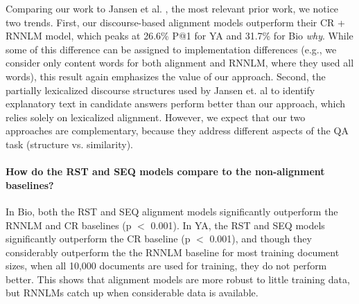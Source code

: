 Comparing our work to Jansen et al. \citeyear{jansen14}, the most relevant prior work, we notice two trends.
First, our discourse-based alignment models outperform their CR + RNNLM model, which peaks at 26.6\% P@1 for YA and 31.7\% for Bio \emph{why}. While some of this difference can be assigned to implementation differences (e.g., we consider only content words for both alignment and RNNLM, where they used all words), this result again emphasizes the value of our approach.
Second, the partially lexicalized discourse structures used by Jansen et. al to identify explanatory text in candidate answers perform better than our approach, which relies solely on lexicalized alignment. However, we expect that our two approaches are complementary, because they address different aspects of the QA task (structure vs. similarity).

\paragraph{How do the RST and SEQ models compare to the non-alignment baselines?}


In Bio, both the RST and SEQ alignment models significantly outperform the RNNLM and CR baselines (p $<$ 0.001).  %
In YA, the RST and SEQ models significantly outperform the CR baseline (p $<$ 0.001), and though 
they considerably outperform the the RNNLM baseline for most training document sizes, when all 10,000 documents are used for training, they do not perform  better.  
This shows that alignment models are more robust to little training data, but RNNLMs catch up when considerable data is available.

